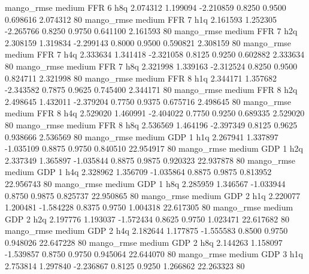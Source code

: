        mango_rmse     medium      FFR                 6                  h8q  2.074312 1.199094 -2.210859 0.8250 0.9500  0.698616    2.074312 80
       mango_rmse     medium      FFR                 7                  h1q  2.161593 1.252305 -2.265766 0.8250 0.9750  0.641100    2.161593 80
       mango_rmse     medium      FFR                 7                  h2q  2.308159 1.319834 -2.299143 0.8000 0.9500  0.590821    2.308159 80
       mango_rmse     medium      FFR                 7                  h4q  2.333634 1.341418 -2.321058 0.8125 0.9250  0.602882    2.333634 80
       mango_rmse     medium      FFR                 7                  h8q  2.321998 1.339163 -2.312524 0.8250 0.9500  0.824711    2.321998 80
       mango_rmse     medium      FFR                 8                  h1q  2.344171 1.357682 -2.343582 0.7875 0.9625  0.745400    2.344171 80
       mango_rmse     medium      FFR                 8                  h2q  2.498645 1.432011 -2.379204 0.7750 0.9375  0.675716    2.498645 80
       mango_rmse     medium      FFR                 8                  h4q  2.529020 1.460991 -2.404022 0.7750 0.9250  0.689335    2.529020 80
       mango_rmse     medium      FFR                 8                  h8q  2.536569 1.464196 -2.397349 0.8125 0.9625  0.938666    2.536569 80
       mango_rmse     medium      GDP                 1                  h1q  2.267941 1.337897 -1.035109 0.8875 0.9750  0.840510   22.954917 80
       mango_rmse     medium      GDP                 1                  h2q  2.337349 1.365897 -1.035844 0.8875 0.9875  0.920323   22.937878 80
       mango_rmse     medium      GDP                 1                  h4q  2.328962 1.356709 -1.035864 0.8875 0.9875  0.813952   22.956743 80
       mango_rmse     medium      GDP                 1                  h8q  2.285959 1.346567 -1.033944 0.8750 0.9875  0.825737   22.950865 80
       mango_rmse     medium      GDP                 2                  h1q  2.220077 1.200481 -1.584228 0.8375 0.9750  1.004318   22.617305 80
       mango_rmse     medium      GDP                 2                  h2q  2.197776 1.193037 -1.572434 0.8625 0.9750  1.023471   22.617682 80
       mango_rmse     medium      GDP                 2                  h4q  2.182644 1.177875 -1.555583 0.8500 0.9750  0.948026   22.647228 80
       mango_rmse     medium      GDP                 2                  h8q  2.144263 1.158097 -1.539857 0.8750 0.9750  0.945064   22.644070 80
       mango_rmse     medium      GDP                 3                  h1q  2.753814 1.297840 -2.236867 0.8125 0.9250  1.266862   22.263323 80
